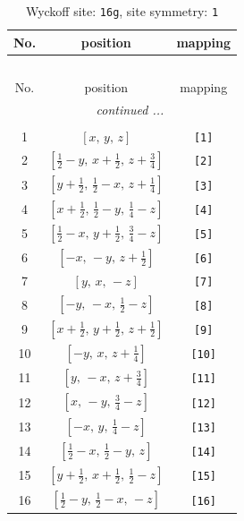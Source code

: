 \documentclass[fleqn,8pt]{jsarticle}
\begin{document}
\begin{longtable}{ccc}
\caption{Wyckoff site: {\tt 16g}, site symmetry: {\tt 1}}
 \\
 \hline \hline
No. & position & mapping \\ \hline \endfirsthead

\multicolumn{2}{l}{\tablename\ \thetable{}} \\
 \hline \hline
No. & position & mapping \\ \hline \endhead

 \hline \hline
\multicolumn{2}{r}{\footnotesize\it continued ...} \\ \endfoot

 \hline \hline
\multicolumn{2}{r}{} \\ \endlastfoot

1 & $\left[ x,\, y,\, z \right]$ & {\tt [1]} \\ \hline
2 & $\left[ \frac{1}{2} - y,\, x + \frac{1}{2},\, z + \frac{3}{4} \right]$ & {\tt [2]} \\ \hline
3 & $\left[ y + \frac{1}{2},\, \frac{1}{2} - x,\, z + \frac{1}{4} \right]$ & {\tt [3]} \\ \hline
4 & $\left[ x + \frac{1}{2},\, \frac{1}{2} - y,\, \frac{1}{4} - z \right]$ & {\tt [4]} \\ \hline
5 & $\left[ \frac{1}{2} - x,\, y + \frac{1}{2},\, \frac{3}{4} - z \right]$ & {\tt [5]} \\ \hline
6 & $\left[ - x,\, - y,\, z + \frac{1}{2} \right]$ & {\tt [6]} \\ \hline
7 & $\left[ y,\, x,\, - z \right]$ & {\tt [7]} \\ \hline
8 & $\left[ - y,\, - x,\, \frac{1}{2} - z \right]$ & {\tt [8]} \\ \hline
9 & $\left[ x + \frac{1}{2},\, y + \frac{1}{2},\, z + \frac{1}{2} \right]$ & {\tt [9]} \\ \hline
10 & $\left[ - y,\, x,\, z + \frac{1}{4} \right]$ & {\tt [10]} \\ \hline
11 & $\left[ y,\, - x,\, z + \frac{3}{4} \right]$ & {\tt [11]} \\ \hline
12 & $\left[ x,\, - y,\, \frac{3}{4} - z \right]$ & {\tt [12]} \\ \hline
13 & $\left[ - x,\, y,\, \frac{1}{4} - z \right]$ & {\tt [13]} \\ \hline
14 & $\left[ \frac{1}{2} - x,\, \frac{1}{2} - y,\, z \right]$ & {\tt [14]} \\ \hline
15 & $\left[ y + \frac{1}{2},\, x + \frac{1}{2},\, \frac{1}{2} - z \right]$ & {\tt [15]} \\ \hline
16 & $\left[ \frac{1}{2} - y,\, \frac{1}{2} - x,\, - z \right]$ & {\tt [16]} \\
\end{longtable}
\end{document}
